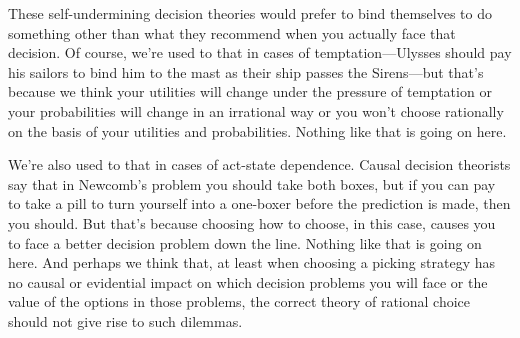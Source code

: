 \documentclass[a4paper,final]{article}
\newenvironment{CCM rewritten}
{\begingroup\color{blue}} %
{\endgroup}              %
\begin{document}


These self-undermining decision theories would prefer to bind themselves to do something other than what they recommend when you actually face that decision.
Of course, we're used to that in cases of temptation---Ulysses should pay his sailors to bind him to the mast as their ship passes the Sirens---but that's because we think your utilities will change under the pressure of temptation or your probabilities will change in an irrational way or you won't choose rationally on the basis of your utilities and probabilities. Nothing like that is going on here.

We're also used to that in cases of act-state dependence. Causal decision theorists say that in Newcomb's problem you should take both boxes, but if you can pay to take a pill to turn yourself into a one-boxer before the prediction is made, then you should. But that's because choosing how to choose, in this case, causes you to face a better decision problem down the line. Nothing like that is going on here. And perhaps we think that, at least when choosing a picking strategy has no causal or evidential impact on which decision problems you will face or the value of the options in those problems, the correct theory of rational choice should not give rise to such dilemmas.
\end{document}
